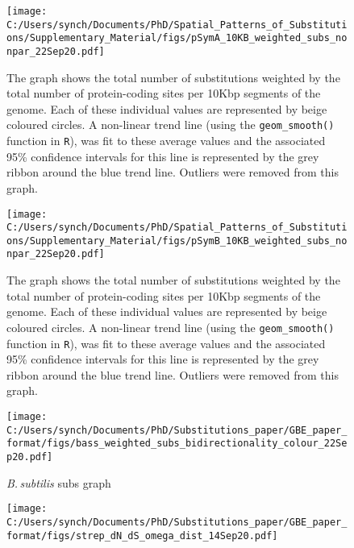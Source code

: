 \documentclass[12pt]{article}
\newcommand{\bass}{\textit{B.\,subtilis}\xspace}
\begin{document}
\begin{figure}[h]
	\begin{center}
		\texttt{[image: C:/Users/synch/Documents/PhD/Spatial\_Patterns\_of\_Substitutions/Supplementary\_Material/figs/pSymA\_10KB\_weighted\_subs\_nonpar\_22Sep20.pdf]}
		\caption{\label{fig:pSymA_nonpar}The graph shows the total number of substitutions weighted by the total number of protein-coding sites per 10Kbp segments of the genome. Each of these individual values are represented by beige coloured circles. A non-linear trend line (using the \texttt{geom\_smooth()} function in \texttt{R}), was fit to these average values and the associated 95\% confidence intervals for this line is represented by the grey ribbon around the blue trend line. Outliers were removed from this graph.}
	\end{center}
\end{figure}

\begin{figure}[h]
	\begin{center}
		\texttt{[image: C:/Users/synch/Documents/PhD/Spatial\_Patterns\_of\_Substitutions/Supplementary\_Material/figs/pSymB\_10KB\_weighted\_subs\_nonpar\_22Sep20.pdf]}
		\caption{\label{fig:pSymB_nonpar}The graph shows the total number of substitutions weighted by the total number of protein-coding sites per 10Kbp segments of the genome. Each of these individual values are represented by beige coloured circles. A non-linear trend line (using the \texttt{geom\_smooth()} function in \texttt{R}), was fit to these average values and the associated 95\% confidence intervals for this line is represented by the grey ribbon around the blue trend line. Outliers were removed from this graph.}
	\end{center}
\end{figure}


\begin{figure}[h]
	\begin{center}
		\texttt{[image: C:/Users/synch/Documents/PhD/Substitutions\_paper/GBE\_paper\_format/figs/bass\_weighted\_subs\_bidirectionality\_colour\_22Sep20.pdf]}
		\caption{\label{fig:bass_subs_bar} \bass subs graph}
	\end{center}
\end{figure}

\begin{figure}[h]
	\begin{center}
		\texttt{[image: C:/Users/synch/Documents/PhD/Substitutions\_paper/GBE\_paper\_format/figs/strep\_dN\_dS\_omega\_dist\_14Sep20.pdf]}
		\caption{\label{fig:strep_selection}}
	\end{center}
\end{figure}
\end{document}
